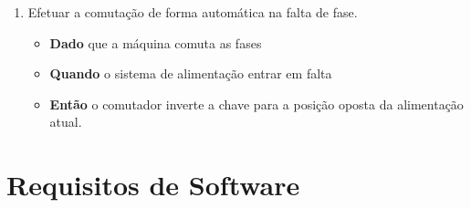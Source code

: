 \begin{enumerate}
\begin{enumerate}
					\item Efetuar a comutação de forma automática na falta de fase.
						\begin{itemize}
							\item \textbf{Dado} que a máquina comuta as fases
							\item \textbf{Quando} o sistema de alimentação entrar em falta
							\item \textbf{Então} o comutador inverte a chave para a posição oposta da alimentação 
							atual.
						\end{itemize}
				\end{enumerate}
		\end{enumerate}

	\section[Requisitos de Software]{Requisitos de Software}

